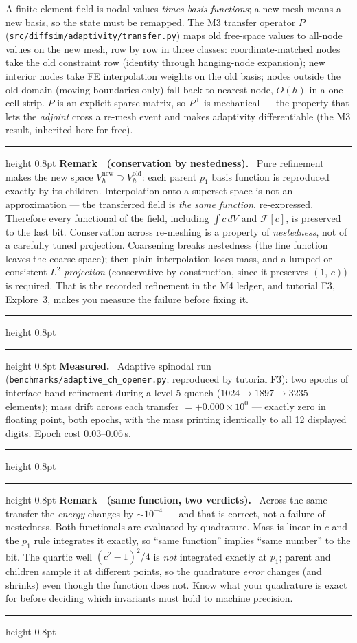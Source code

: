 \documentclass[11pt]{article}
\newcounter{remark}
\newenvironment{remark}[1]{%
  \refstepcounter{remark}\par\medskip
  \noindent\begin{minipage}{\linewidth}
  \hrule height 0.8pt \smallskip
  \textbf{Remark \theremark\ (#1).}\ }{%
  \smallskip\hrule height 0.8pt \end{minipage}\par\medskip}
\newenvironment{measured}{%
  \par\medskip\noindent\begin{minipage}{\linewidth}
  \hrule height 0.8pt \smallskip
  \textbf{Measured.}\ }{%
  \smallskip\hrule height 0.8pt \end{minipage}\par\medskip}
\newcommand{\ip}[2]{\left(#1,\,#2\right)}
\begin{document}
A finite-element field is nodal values \emph{times basis functions};
a new mesh means a new basis, so the state must be remapped. The M3
transfer operator $P$
(\texttt{src/diffsim/adaptivity/transfer.py}) maps old free-space
values to all-node values on the new mesh, row by row in three
classes: coordinate-matched nodes take the old constraint row
(identity through hanging-node expansion); new interior nodes take FE
interpolation weights on the old basis; nodes outside the old domain
(moving boundaries only) fall back to nearest-node, $O(h)$ in a
one-cell strip. $P$ is an explicit sparse matrix, so $P^{\!\top}$ is
mechanical --- the property that lets the \emph{adjoint} cross a
re-mesh event and makes adaptivity differentiable (the M3 result,
inherited here for free).

\begin{remark}{conservation by nestedness}
Pure refinement makes the new space $V_h^{\text{new}} \supset
V_h^{\text{old}}$: each parent $p_1$ basis function is reproduced
exactly by its children. Interpolation onto a superset space is not an
approximation --- the transferred field is \emph{the same function},
re-expressed. Therefore every functional of the field, including
$\int c\, dV$ and $\mathcal{F}[c]$, is preserved to the last bit.
Conservation across re-meshing is a property of \emph{nestedness}, not
of a carefully tuned projection. Coarsening breaks nestedness (the
fine function leaves the coarse space); then plain interpolation loses
mass, and a lumped or consistent $L^2$ \emph{projection} (conservative
by construction, since it preserves $\ip{1}{c}$) is required. That is
the recorded refinement in the M4 ledger, and tutorial F3, Explore~3,
makes you measure the failure before fixing it.
\end{remark}

\begin{measured}
Adaptive spinodal run (\texttt{benchmarks/adaptive\_ch\_opener.py};
reproduced by tutorial F3): two epochs of interface-band refinement
during a level-5 quench ($1024 \to 1897 \to 3235$ elements); mass
drift across each transfer $= +0.000\times10^{0}$ --- exactly zero in
floating point, both epochs, with the mass printing identically to all
12 displayed digits. Epoch cost 0.03--0.06\,s.
\end{measured}

\begin{remark}{same function, two verdicts}
Across the same transfer the \emph{energy} changes by
$\sim\!10^{-4}$ --- and that is correct, not a failure of nestedness.
Both functionals are evaluated by quadrature. Mass is linear in $c$
and the $p_1$ rule integrates it exactly, so ``same function'' implies
``same number'' to the bit. The quartic well $(c^2-1)^2/4$ is
\emph{not} integrated exactly at $p_1$; parent and children sample it
at different points, so the quadrature \emph{error} changes (and
shrinks) even though the function does not. Know what your quadrature
is exact for before deciding which invariants must hold to machine
precision.
\end{remark}
\end{document}
